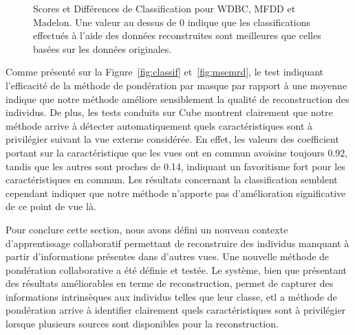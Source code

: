 \documentclass[a4paper]{article}
\begin{document}
\begin{figure}[h]
    \quad
    \caption{Scores et Différences de Classification pour WDBC, MFDD et Madelon. Une valeur au dessus de 0 indique que les classifications effectués à l'aide des données reconstruites sont meilleures que celles basées sur les données originales.}
\end{figure}

Comme présenté sur la Figure~\ref{fig:classif} et~\ref{fig:msemrd}, le test indiquant l'efficacité de la méthode de pondération par masque par rapport à une moyenne indique que notre méthode améliore sensiblement la qualité de reconstruction des individus. De plus, les tests conduits sur Cube montrent clairement que notre méthode arrive à détecter automatiquement quels caractéristiques sont à privilégier suivant la vue externe considérée. En effet, les valeurs des coefficient portant sur la caractéristique que les vues ont en commun avoisine toujours 0.92, tandis que les autres sont proches de 0.14, indiquant un favoritisme fort pour les caractéristiques en commun. Les résultats concernant la classification semblent cependant indiquer que notre méthode n'apporte pas d'amélioration significative de ce point de vue là.

Pour conclure cette section, nous avons défini un nouveau contexte d'apprentissage collaboratif permettant de reconstruire des individus manquant à partir d'informations présentes dans d'autres vues. Une nouvelle méthode de pondération collaborative a été définie et testée. Le système, bien que présentant des résultats améliorables en terme de reconstruction, permet de capturer des informations intrinsèques aux individus telles que leur classe, etl a méthode de pondération arrive à identifier clairement quels caractéristiques sont à privilégier lorsque plusieurs sources sont disponibles pour la reconstruction.
\end{document}
